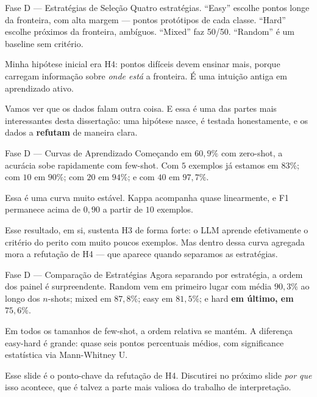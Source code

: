 \documentclass[aspectratio=169,10pt]{beamer}
\begin{document}
\begin{frame}{Fase D --- Estrat\'egias de Sele\c{c}\~ao}
  \small
  Quatro estrat\'egias. ``Easy'' escolhe pontos longe da fronteira, com alta margem --- pontos
  prot\'otipos de cada classe. ``Hard'' escolhe pr\'oximos da fronteira, amb\'iguos. ``Mixed'' faz
  50/50. ``Random'' \'e um baseline sem crit\'erio.
  \medskip

  Minha hip\'otese inicial era H4: pontos dif\'iceis devem ensinar mais, porque carregam informa\c{c}\~ao
  sobre \emph{onde est\'a} a fronteira. \'E uma intui\c{c}\~ao antiga em aprendizado ativo.
  \medskip

  Vamos ver que os dados falam outra coisa. E essa \'e uma das partes mais interessantes desta
  disserta\c{c}\~ao: uma hip\'otese nasce, \'e testada honestamente, e os dados a \textbf{refutam}
  de maneira clara.
\end{frame}

\begin{frame}{Fase D --- Curvas de Aprendizado}
  \small
  Come\c{c}ando em $60{,}9\%$ com zero-shot, a acur\'acia sobe rapidamente com few-shot. Com $5$ exemplos
  j\'a estamos em $83\%$; com $10$ em $90\%$; com $20$ em $94\%$; e com $40$ em \textbf{$97{,}7\%$}.
  \medskip

  Essa \'e uma curva muito est\'avel. Kappa acompanha quase linearmente, e F1 permanece acima de $0{,}90$
  a partir de $10$ exemplos.
  \medskip

  Esse resultado, em si, sustenta H3 de forma forte: o LLM aprende efetivamente o crit\'erio do perito
  com muito poucos exemplos. Mas dentro dessa curva agregada mora a refuta\c{c}\~ao de H4 --- que
  aparece quando separamos as estrat\'egias.
\end{frame}

\begin{frame}{Fase D --- Compara\c{c}\~ao de Estrat\'egias}
  \small
  Agora separando por estrat\'egia, a ordem dos painel \'e surpreendente. Random vem em primeiro lugar
  com m\'edia $90{,}3\%$ ao longo dos $n$-shots; mixed em $87{,}8\%$; easy em $81{,}5\%$; e hard \textbf{em
  \'ultimo, em $75{,}6\%$}.
  \medskip

  Em todos os tamanhos de few-shot, a ordem relativa se mant\'em. A diferen\c{c}a easy-hard \'e grande:
  quase seis pontos percentuais m\'edios, com significance estat\'istica via Mann-Whitney U.
  \medskip

  Esse slide \'e o ponto-chave da refuta\c{c}\~ao de H4. Discutirei no pr\'oximo slide \emph{por que}
  isso acontece, que \'e talvez a parte mais valiosa do trabalho de interpreta\c{c}\~ao.
\end{frame}
\end{document}
